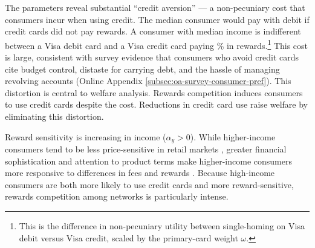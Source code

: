 \documentclass[main.tex]{subfiles}
\begin{document}
The parameters reveal substantial ``credit aversion'' --- a non-pecuniary cost that consumers incur when using credit.
The median consumer would pay with debit if credit cards did not pay rewards.
A consumer with median income is indifferent between a Visa debit card and a Visa credit card paying \% in rewards.\footnote{This is the difference in non-pecuniary utility between single-homing on Visa debit versus Visa credit, scaled by the primary-card weight $\omega$.}
This cost is large, consistent with survey evidence that consumers who avoid credit cards cite budget control, distaste for carrying debt, and the hassle of managing revolving accounts (Online Appendix \ref{subsec:oa-survey-consumer-pref}).
This distortion is central to welfare analysis.
Rewards competition induces consumers to use credit cards despite the cost.
Reductions in credit card use raise welfare by eliminating this distortion.

Reward sensitivity is increasing in income ($\alpha_y > 0$).
While higher-income consumers tend to be less price-sensitive in retail markets \parencite{Sangani2024}, greater financial sophistication and attention to product terms make higher-income consumers more responsive to differences in fees and rewards \parencite{Hastings.etal2017}.
Because high-income consumers are both more likely to use credit cards and more reward-sensitive, rewards competition among networks is particularly intense.

\end{document}
